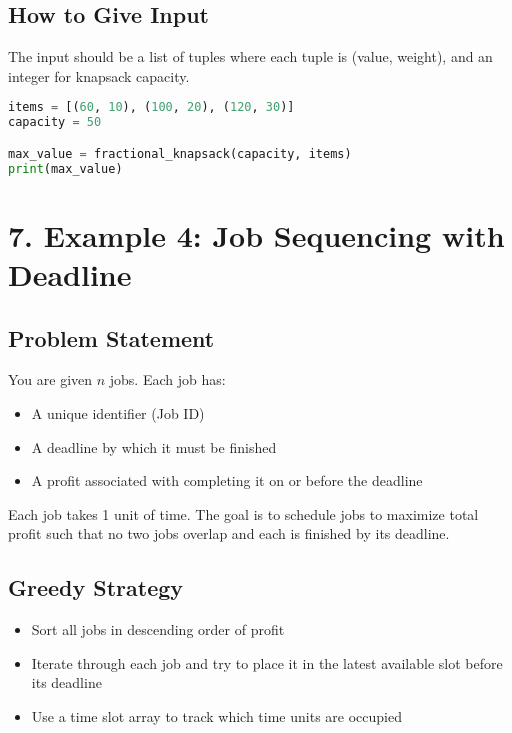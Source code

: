 \documentclass[14pt]{extarticle}
\begin{document}
\subsection*{How to Give Input}

The input should be a list of tuples where each tuple is (value, weight), and an integer for knapsack capacity.

\begin{lstlisting}[language=Python]
items = [(60, 10), (100, 20), (120, 30)]
capacity = 50

max_value = fractional_knapsack(capacity, items)
print(max_value)
\end{lstlisting}

\section*{7. Example 4: Job Sequencing with Deadline}

\subsection*{Problem Statement}

You are given $n$ jobs. Each job has:
\begin{itemize}
    \item A unique identifier (Job ID)
    \item A deadline by which it must be finished
    \item A profit associated with completing it on or before the deadline
\end{itemize}

Each job takes 1 unit of time. The goal is to schedule jobs to maximize total profit such that no two jobs overlap and each is finished by its deadline.

\subsection*{Greedy Strategy}

\begin{itemize}
    \item Sort all jobs in descending order of profit
    \item Iterate through each job and try to place it in the latest available slot before its deadline
    \item Use a time slot array to track which time units are occupied
\end{itemize}
\end{document}
